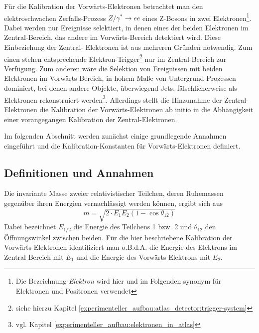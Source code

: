 
Für die Kalibration der Vorwärts-Elektronen betrachtet man den elektroschwachen
Zerfalls-Prozess $Z/\gamma^* \rightarrow ee$ eines Z-Bosons in zwei
Elektronen\footnote{Die Bezeichnung \textit{Elektron} wird hier und im
Folgenden synonym für Elektronen und Positronen verwendet}. Dabei werden nur
Ereignisse selektiert, in denen eines der beiden Elektronen im Zentral-Bereich,
das andere im Vorwärts-Bereich detektiert wird. Diese Einbeziehung der Zentral-
Elektronen ist aus mehreren Gründen notwendig. Zum einen stehen entsprechende
Elektron-Trigger\footnote{siehe hierzu Kapitel
\ref{experimenteller_aufbau:atlas_detector:trigger-system}}
nur im Zentral-Bereich zur Verfügung. Zum anderen wäre die Selektion von
Ereignissen mit beiden Elektronen im Vorwärts-Bereich, in hohem Maße von
Untergrund-Prozessen dominiert, bei denen andere Objekte, überwiegend Jets,
fälschlicherweise als Elektronen rekonstruiert werden\footnote{vgl. Kapitel
\ref{experimenteller_aufbau:elektronen_in_atlas}}.
Allerdings stellt die Hinzunahme der Zentral-Elektronen die Kalibration der
Vorwärts-Elektronen ab initio in die Abhängigkeit einer vorangegangen 
Kalibration der Zentral-Elektronen.

Im folgenden Abschnitt werden zunächst einige grundlegende Annahmen eingeführt
und die Kalibration-Konstanten für Vorwärts-Elektronen definiert.



\subsection{Definitionen und Annahmen}
\label{energy_calibration:definitionen_und_annahmen}

Die invariante Masse zweier relativistischer Teilchen, deren Ruhemassen
gegenüber ihren Energien vernachlässigt werden können, ergibt sich aus
\begin{equation}
    \label{invariant_mass:basic}
    m = \sqrt{ 2 \cdot E_1 E_2 (1-\cos\theta_{12}) }
\end{equation}
Dabei bezeichnet $E_{1/2}$ die Energie des Teilchens 1 bzw. 2 und $\theta_{12}$
den Öffnungswinkel zwischen beiden. Für die hier beschriebene Kalibration der
Vorwärts-Elektronen identifiziert man o.B.d.A. die Energie des Elektrons im
Zentral-Bereich mit $E_1$ und die Energie des Vorwärts-Elektrons mit $E_2$.

